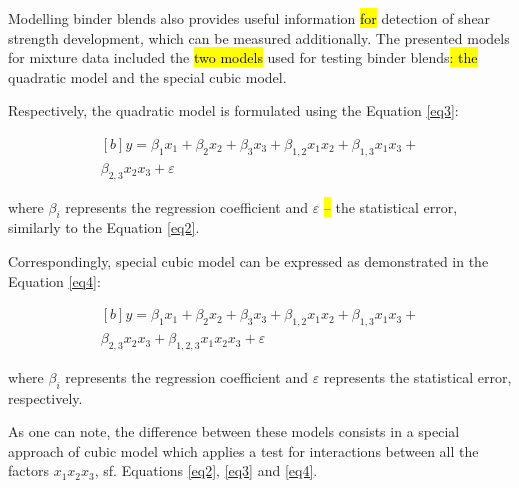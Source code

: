 \documentclass[eprint,
]{actapoly}
\begin{document}
Modelling binder blends also provides useful information \hl{for }detection of shear strength development, which can be measured additionally. The presented models for mixture data included the \hl{two models} used for testing binder blends\hl{: the }quadratic model and the special cubic model. 

Respectively, the quadratic model is formulated using the\hl{ }Equation \ref{eq3}:

\begin{equation}\label{eq3}
\begin{aligned}[b]
y=\beta_{1}x_{1}+\beta_{2}x_{2}+\beta_{3}x_{3}+\beta_{1,2}x_{1}x_{2}+\beta_{1,3}x_{1}x_{3}+\\\beta_{2,3}x_{2}x_{3}+\varepsilon
\end{aligned}
\end{equation}

where $\beta_i$ represents the regression coefficient and $\varepsilon$\hl{ -- }the statistical error, similarly to the Equation \ref{eq2}.

Correspondingly, special cubic model can be expressed as demonstrated in the Equation \ref{eq4}:

\begin{equation}\label{eq4}
\begin{aligned}[b]
y=\beta_{1}x_{1}+\beta_{2}x_{2}+\beta_{3}x_{3}+\beta_{1,2}x_{1}x_{2}+\beta_{1,3}x_{1}x_{3}+\\\beta_{2,3}x_{2}x_{3}+\beta_{1,2,3}x_{1}x_{2}x_{3}+\varepsilon
\end{aligned}
\end{equation}

where $\beta_i$ represents the regression coefficient and $\varepsilon$ represents the statistical error, respectively. 

As one can note, the difference between these models consists in a special approach of cubic model which applies a test for interactions between all the factors $x_{1}x_{2}x_{3}$, sf. Equations \ref{eq2}, \ref{eq3} and \ref{eq4}.
\end{document}
